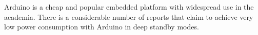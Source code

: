 \documentclass[12pt,english]{amsart}
\begin{document}
Arduino is a cheap and popular embedded platform with widespread use in the
academia.
%
There is a considerable number of reports that claim to achieve very low power
consumption with Arduino in deep standby modes.
%

\end{document}
